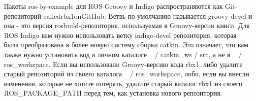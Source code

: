 

Пакеты ros-by-example для ROS Groovy и Indigo распространяются как Git-репозиторий calledrbx1onGitHub. Ветвь по умолчанию называется groovy-devel и она - это версия rosbuild-репозитория, используемая в Groovy-версии книги. Для ROS Indigo вам нужно использовать ветку indigo-devel репозитория, которая была преобразована в более новую систему сборки catkin. Это означает, что вам также нужно установить код в личном каталоге ~ / catkin\_ws / src, а не в ~ / ros\_workspace. Если вы использовали Groovy-версию кода rbx1, либо удалите старый репозиторий из своего каталога ~ / ros\_workspace, либо, если вы внесли изменения, которые не хотите потерять, удалите старый каталог rbx1 из своего ROS\_PACKAGE\_PATH перед тем, как установка нового репозитория. 


